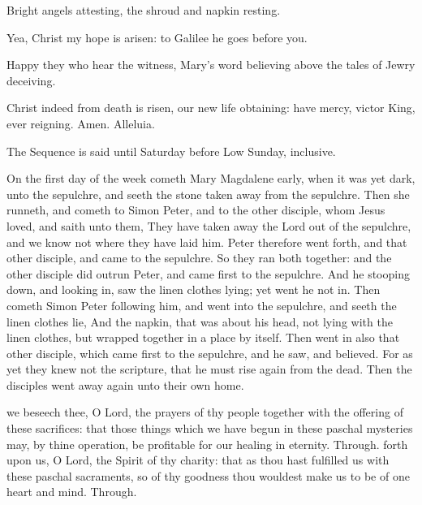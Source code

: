 Bright angels attesting, the shroud and napkin resting.\par
Yea, Christ my hope is arisen: to Galilee he goes before you.\par
Happy they who hear the witness, Mary's word believing above the tales of Jewry deceiving.\par
Christ indeed from death is risen, our new life obtaining: have mercy, victor King, ever reigning. Amen. Alleluia.
\begin{rubric}
     The Sequence is said until Saturday before Low Sunday, inclusive.
\end{rubric}
 On the first day of the week cometh Mary Magdalene early, when it was yet dark, unto the sepulchre, and seeth the stone taken away from the sepulchre. Then she runneth, and cometh to Simon Peter, and to the other disciple, whom Jesus loved, and saith unto them, They have taken away the Lord out of the sepulchre, and we know not where they have laid him. Peter therefore went forth, and that other disciple, and came to the sepulchre. So they ran both together: and the other disciple did outrun Peter, and came first to the sepulchre. And he stooping down, and looking in, saw the linen clothes lying; yet went he not in. Then cometh Simon Peter following him, and went into the sepulchre, and seeth the linen clothes lie, And the napkin, that was about his head, not lying with the linen clothes, but wrapped together in a place by itself. Then went in also that other disciple, which came first to the sepulchre, and he saw, and believed. For as yet they knew not the scripture, that he must rise again from the dead. Then the disciples went away again unto their own home.


\secret\label{EasterSecret}
 we beseech thee, O Lord, the prayers of thy people together with the offering of these sacrifices: that those things which we have begun in these paschal mysteries may, by thine operation, be profitable for our healing in eternity. Through.
\postcommunion\label{EasterPostcommunion}
 forth upon us, O Lord, the Spirit of thy charity: that as thou hast fulfilled us with these paschal sacraments, so of thy goodness thou wouldest make us to be of one heart and mind. Through.


